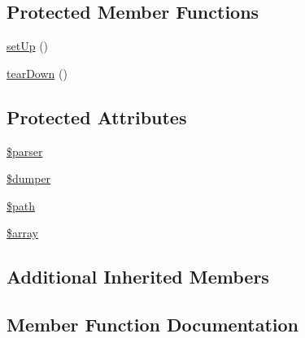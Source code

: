 \subsection*{Protected Member Functions}
\begin{DoxyCompactItemize}
\item 
\mbox{\hyperlink{class_symfony_1_1_component_1_1_yaml_1_1_tests_1_1_dumper_test_a0bc688732d2b3b162ffebaf7812e78da}{set\+Up}} ()
\item 
\mbox{\hyperlink{class_symfony_1_1_component_1_1_yaml_1_1_tests_1_1_dumper_test_a80fe3d17e658907fc75346a0ec9d6fc7}{tear\+Down}} ()
\end{DoxyCompactItemize}
\subsection*{Protected Attributes}
\begin{DoxyCompactItemize}
\item 
\mbox{\hyperlink{class_symfony_1_1_component_1_1_yaml_1_1_tests_1_1_dumper_test_a147a766daa03d52576c7345fea31c945}{\$parser}}
\item 
\mbox{\hyperlink{class_symfony_1_1_component_1_1_yaml_1_1_tests_1_1_dumper_test_a6b5e16ac66fbfbc3d002d97555af1920}{\$dumper}}
\item 
\mbox{\hyperlink{class_symfony_1_1_component_1_1_yaml_1_1_tests_1_1_dumper_test_a0a4baf0b22973c07685c3981f0d17fc4}{\$path}}
\item 
\mbox{\hyperlink{class_symfony_1_1_component_1_1_yaml_1_1_tests_1_1_dumper_test_ac1361b8d873c1f927b21b809f99e5752}{\$array}}
\end{DoxyCompactItemize}
\subsection*{Additional Inherited Members}


\subsection{Member Function Documentation}
\mbox{\label{class_symfony_1_1_component_1_1_yaml_1_1_tests_1_1_dumper_test_a85925167fbf83c4bb9fefb0ba5705ab4}} 
